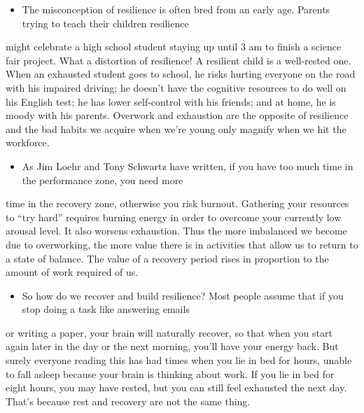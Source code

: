 \documentclass[UTF8,11pt]{ctexart}
\begin{document}
\begin{itemize}[leftmargin=2em,itemsep=.2em,topsep=.4em]\item[G.] The misconception of resilience is often bred from an early age. Parents trying to teach their children resilience
\end{itemize}

might celebrate a high school student staying up until 3 am to finish a science fair project. What a distortion of resilience! A resilient child is a well-rested one. When an exhausted student goes to school, he risks hurting everyone on the road with his impaired driving; he doesn’t have the cognitive resources to do well on his English test; he has lower self-control with his friends; and at home, he is moody with his parents. Overwork and exhaustion are the opposite of resilience and the bad habits we acquire when we’re young only magnify when we hit the workforce.


\begin{itemize}[leftmargin=2em,itemsep=.2em,topsep=.4em]\item[H.] As Jim Loehr and Tony Schwartz have written, if you have too much time in the performance zone, you need more
\end{itemize}

time in the recovery zone, otherwise you risk burnout. Gathering your resources to “try hard” requires burning energy in order to overcome your currently low arousal level. It also worsens exhaustion. Thus the more imbalanced we become due to overworking, the more value there is in activities that allow us to return to a state of balance. The value of a recovery period rises in proportion to the amount of work required of us.


\begin{itemize}[leftmargin=2em,itemsep=.2em,topsep=.4em]\item[I.] So how do we recover and build resilience? Most people assume that if you stop doing a task like answering emails
\end{itemize}

or writing a paper, your brain will naturally recover, so that when you start again later in the day or the next morning, you’ll have your energy back. But surely everyone reading this has had times when you lie in bed for hours, unable to fall asleep because your brain is thinking about work. If you lie in bed for eight hours, you may have rested, but you can still feel exhausted the next day. That’s because rest and recovery are not the same thing.
\end{document}
